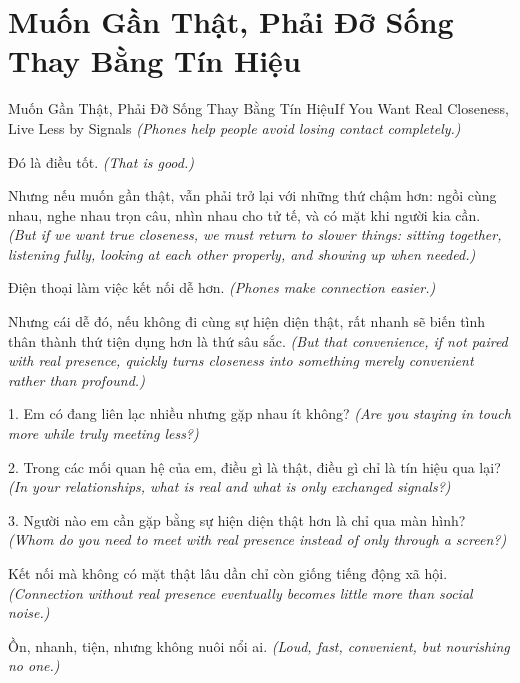 \section{Muốn Gần Thật, Phải Đỡ Sống Thay Bằng Tín Hiệu}
\begin{truyen}{Muốn Gần Thật, Phải Đỡ Sống Thay Bằng Tín Hiệu}{If You Want Real Closeness, Live Less by Signals}
\textit{(Phones help people avoid losing contact completely.)}

Đó là điều tốt.
\textit{(That is good.)}

Nhưng nếu muốn gần thật, vẫn phải trở lại với những thứ chậm hơn: ngồi cùng nhau, nghe nhau trọn câu, nhìn nhau cho tử tế, và có mặt khi người kia cần.
\textit{(But if we want true closeness, we must return to slower things: sitting together, listening fully, looking at each other properly, and showing up when needed.)}

\end{truyen}

\begin{baihoc}
Điện thoại làm việc kết nối dễ hơn.
\textit{(Phones make connection easier.)}

Nhưng cái dễ đó, nếu không đi cùng sự hiện diện thật, rất nhanh sẽ biến tình thân thành thứ tiện dụng hơn là thứ sâu sắc.
\textit{(But that convenience, if not paired with real presence, quickly turns closeness into something merely convenient rather than profound.)}
\end{baihoc}

\begin{tuhocnhanh}
1. Em có đang liên lạc nhiều nhưng gặp nhau ít không? \textit{(Are you staying in touch more while truly meeting less?)}

2. Trong các mối quan hệ của em, điều gì là thật, điều gì chỉ là tín hiệu qua lại? \textit{(In your relationships, what is real and what is only exchanged signals?)}

3. Người nào em cần gặp bằng sự hiện diện thật hơn là chỉ qua màn hình? \textit{(Whom do you need to meet with real presence instead of only through a screen?)}
\end{tuhocnhanh}

\begin{tongketchuong}
Kết nối mà không có mặt thật lâu dần chỉ còn giống tiếng động xã hội.
\textit{(Connection without real presence eventually becomes little more than social noise.)}

Ồn, nhanh, tiện, nhưng không nuôi nổi ai.
\textit{(Loud, fast, convenient, but nourishing no one.)}
\end{tongketchuong}

\ngancach